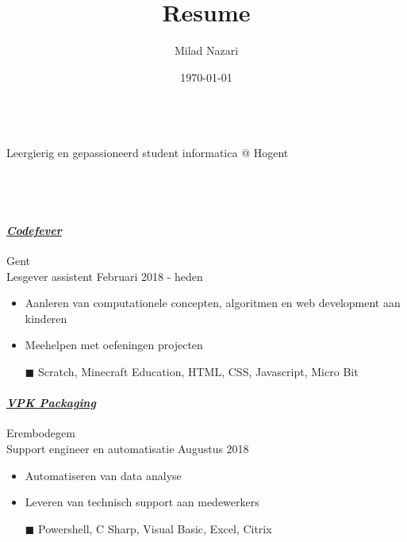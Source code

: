 \documentclass[a4paper, twoside]{article}
\title{Resume}
\author{ Milad Nazari }
\date{\today}
\begin{document}
\begin{multicols}{2}
\\
\noindent Leergierig en gepassioneerd student informatica @ Hogent
\paragraph{}
\hfill{}\par
\hfill{}\par
\hfill{}\par
\end{multicols}
\begin{mdframed}
\section*{\textcolor{white}{ Ervaring }}
\end{mdframed}
\paragraph{\textbf{\textit{\href{https://codefever.be }{\textcolor{blueDark}{ Codefever }}}}} \hfill\small Gent \\
Lesgever assistent \hfill\small
Februari 2018
- heden
\begin{itemize}
\itemsep-0.2em
\item Aanleren van computationele concepten, algoritmen en web development aan kinderen
\item Meehelpen met oefeningen projecten
\item[\color{orange}$\blacksquare$] Scratch, Minecraft Education, HTML, CSS, Javascript, Micro Bit
\end{itemize}
\paragraph{\textbf{\textit{\href{https://vpkgroup.com }{\textcolor{blueDark}{ VPK Packaging }}}}} \hfill\small Erembodegem \\
Support engineer en automatisatie \hfill\small
Augustus 2018
\begin{itemize}
\itemsep-0.2em
\item Automatiseren van data analyse
\item Leveren van technisch support aan medewerkers
\item[\color{orange}$\blacksquare$] Powershell, C Sharp, Visual Basic, Excel, Citrix
\end{itemize}
\end{document}
